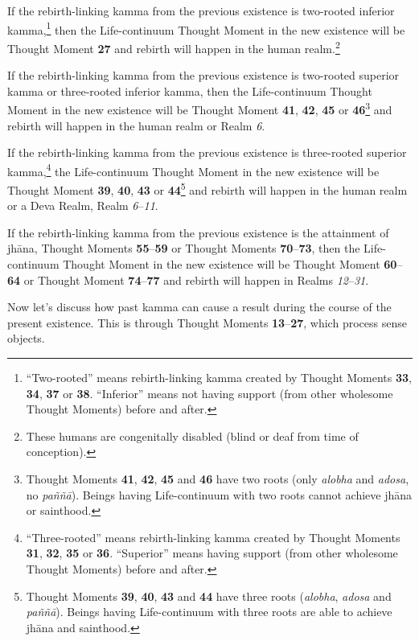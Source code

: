 If the rebirth-linking kamma from the previous existence is two-rooted inferior kamma,\footnote{“Two-rooted” means rebirth-linking kamma created by Thought Moments \textbf{33}, \textbf{34}, \textbf{37} or \textbf{38}. “Inferior” means not having support (from other wholesome Thought Moments) before and after.} then the Life-continuum Thought Moment in the new existence will be Thought Moment \textbf{27} and rebirth will happen in the human realm.\footnote{These humans are congenitally disabled (blind or deaf from time of conception).}

If the rebirth-linking kamma from the previous existence is two-rooted superior kamma or three-rooted inferior kamma, then the Life-continuum Thought Moment in the new existence will be Thought Moment \textbf{41}, \textbf{42}, \textbf{45} or \textbf{46}\footnote{Thought Moments \textbf{41}, \textbf{42}, \textbf{45} and \textbf{46} have two roots (only \textit{alobha} and \textit{adosa}, no \textit{paññā}). Beings having Life-continuum with two roots cannot achieve jhāna or sainthood.} and rebirth will happen in the human realm or Realm \textit{6}. 

If the rebirth-linking kamma from the previous existence is three-rooted superior kamma,\footnote{“Three-rooted” means rebirth-linking kamma created by Thought Moments \textbf{31}, \textbf{32}, \textbf{35} or \textbf{36}. “Superior” means having support (from other wholesome Thought Moments) before and after.} the Life-continuum Thought Moment in the new existence will be Thought Moment \textbf{39}, \textbf{40}, \textbf{43} or \textbf{44}\footnote{Thought Moments \textbf{39}, \textbf{40}, \textbf{43} and \textbf{44} have three roots (\textit{alobha}, \textit{adosa} and \textit{paññā}). Beings having Life-continuum with three roots are able to achieve jhāna and sainthood.} and rebirth will happen in the human realm or a Deva Realm, Realm \textit{6}--\textit{11}.

If the rebirth-linking kamma from the previous existence is the attainment of jhāna, Thought Moments \textbf{55}--\textbf{59} or Thought Moments \textbf{70}--\textbf{73}, then the Life-continuum Thought Moment in the new existence will be Thought Moment \textbf{60}--\textbf{64} or Thought Moment \textbf{74}--\textbf{77} and rebirth will happen in Realms \textit{12}--\textit{31}.

Now let’s discuss how past kamma can cause a result during the course of the present existence. This is through Thought Moments \textbf{13}--\textbf{27}, which process sense objects.

